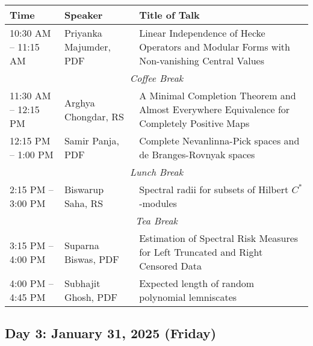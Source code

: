 \noindent
\renewcommand{\arraystretch}{1.5} %
\begin{tabular}{|p{3.5cm}|p{4cm}|p{7cm}|}
	\hline
	\textbf{Time} & \textbf{Speaker} & \textbf{Title of Talk} \\
	\hline
	10:30 AM -- 11:15 AM & Priyanka Majumder, PDF & Linear Independence of Hecke Operators and Modular Forms with Non-vanishing Central Values \\
	\hline
	\multicolumn{3}{|c|}{\textit{Coffee Break}} \\
	\hline
	11:30 AM -- 12:15 PM & Arghya Chongdar, RS & A Minimal Completion Theorem and Almost Everywhere Equivalence for Completely Positive Maps \\
	\hline
	12:15 PM -- 1:00 PM & Samir Panja, PDF & Complete Nevanlinna-Pick spaces and de Branges-Rovnyak spaces \\
	\hline
	\multicolumn{3}{|c|}{\textit{Lunch Break}} \\
	\hline
	2:15 PM -- 3:00 PM & Biswarup Saha, RS & Spectral radii for subsets of Hilbert $C^*$-modules \\
	\hline
	\multicolumn{3}{|c|}{\textit{Tea Break}} \\
	\hline
	3:15 PM -- 4:00 PM & Suparna Biswas, PDF &  Estimation of Spectral Risk Measures for Left Truncated and Right Censored Data  \\
	\hline

	4:00 PM -- 4:45 PM & Subhajit Ghosh, PDF & Expected length of random polynomial lemniscates \\
	\hline

\end{tabular}

\subsection*{Day 3: January 31, 2025 (Friday)}

